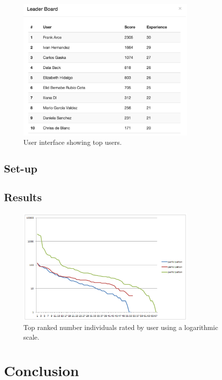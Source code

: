 \documentclass[conference]{IEEEtran}
\begin{document}
\begin{figure}[!t]
    \centering
        \includegraphics[width=3.5in]{img/leaderBoard.png}
    \caption{User interface showing top users.}
    \label{fig:top-users}
\end{figure}



\subsection{Set-up}
\label{sec:setup}


\subsection{Results}
\label{sec:results}

\begin{figure}[!t]
    \centering
        \includegraphics[width=3.5in]{img/comparison.png}
    \caption{Top ranked number individuals rated by user using a
     logarithmic scale.}
    \label{fig:top-ranked-participation}
\end{figure}


\section{Conclusion}
\label{sec:conclusions}
\end{document}
